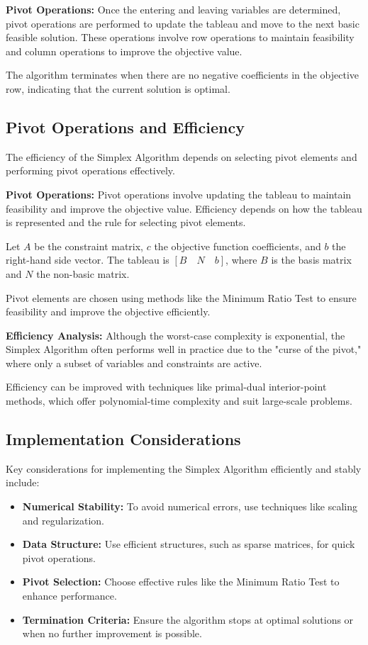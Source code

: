 \documentclass[12pt]{book} %
\begin{document}
\textbf{Pivot Operations:} Once the entering and leaving variables are determined, pivot operations are performed to update the tableau and move to the next basic feasible solution. These operations involve row operations to maintain feasibility and column operations to improve the objective value.

The algorithm terminates when there are no negative coefficients in the objective row, indicating that the current solution is optimal.

\subsection{Pivot Operations and Efficiency}

The efficiency of the Simplex Algorithm depends on selecting pivot elements and performing pivot operations effectively.

\textbf{Pivot Operations:} Pivot operations involve updating the tableau to maintain feasibility and improve the objective value. Efficiency depends on how the tableau is represented and the rule for selecting pivot elements.

Let \(A\) be the constraint matrix, \(c\) the objective function coefficients, and \(b\) the right-hand side vector. The tableau is \([B \quad N \quad b]\), where \(B\) is the basis matrix and \(N\) the non-basic matrix.

Pivot elements are chosen using methods like the Minimum Ratio Test to ensure feasibility and improve the objective efficiently.

\textbf{Efficiency Analysis:} Although the worst-case complexity is exponential, the Simplex Algorithm often performs well in practice due to the "curse of the pivot," where only a subset of variables and constraints are active.

Efficiency can be improved with techniques like primal-dual interior-point methods, which offer polynomial-time complexity and suit large-scale problems.

\subsection{Implementation Considerations}

Key considerations for implementing the Simplex Algorithm efficiently and stably include:

\begin{itemize}
    \item \textbf{Numerical Stability:} To avoid numerical errors, use techniques like scaling and regularization.
    \item \textbf{Data Structure:} Use efficient structures, such as sparse matrices, for quick pivot operations.
    \item \textbf{Pivot Selection:} Choose effective rules like the Minimum Ratio Test to enhance performance.
    \item \textbf{Termination Criteria:} Ensure the algorithm stops at optimal solutions or when no further improvement is possible.
\end{itemize}
\end{document}
